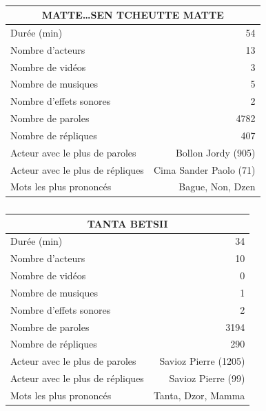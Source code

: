     \begin{table}[]
    \centering
    \caption{}
    \begin{tabular}{lr}\toprule\multicolumn{2}{c}{MATTE\ldots SEN TCHEUTTE MATTE} \\\midrule
\multicolumn{1}{l}{Durée (min)}&54\\
\multicolumn{1}{l}{Nombre d'acteurs}&13\\
\multicolumn{1}{l}{Nombre de vidéos}&3\\
\multicolumn{1}{l}{Nombre de musiques}&5\\
\multicolumn{1}{l}{Nombre d'effets sonores}&2\\
\multicolumn{1}{l}{Nombre de paroles}&4782\\
\multicolumn{1}{l}{Nombre de répliques}&407\\
\multicolumn{1}{l}{Acteur avec le plus de paroles}&Bollon Jordy (905)\\
\multicolumn{1}{l}{Acteur avec le plus de répliques}&Cima Sander Paolo (71)\\
\multicolumn{1}{l}{Mots les plus prononcés}&Bague, Non, Dzen\\
    \bottomrule
    \end{tabular}%
    \end{table}
    \begin{table}[]
    \centering
    \caption{}
    \begin{tabular}{lr}\toprule\multicolumn{2}{c}{TANTA BETSII} \\\midrule
\multicolumn{1}{l}{Durée (min)}&34\\
\multicolumn{1}{l}{Nombre d'acteurs}&10\\
\multicolumn{1}{l}{Nombre de vidéos}&0\\
\multicolumn{1}{l}{Nombre de musiques}&1\\
\multicolumn{1}{l}{Nombre d'effets sonores}&2\\
\multicolumn{1}{l}{Nombre de paroles}&3194\\
\multicolumn{1}{l}{Nombre de répliques}&290\\
\multicolumn{1}{l}{Acteur avec le plus de paroles}&Savioz Pierre (1205)\\
\multicolumn{1}{l}{Acteur avec le plus de répliques}&Savioz Pierre (99)\\
\multicolumn{1}{l}{Mots les plus prononcés}&Tanta, Dzor, Mamma\\
    \bottomrule
    \end{tabular}%
    \end{table}

